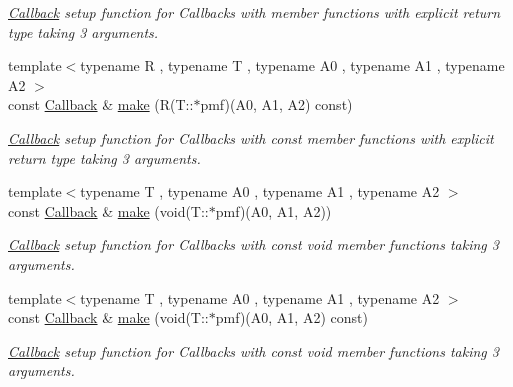 \begin{DoxyCompactItemize}
\begin{DoxyCompactList}\small\item\em \hyperlink{class_d_d4hep_1_1_callback}{Callback} setup function for Callbacks with member functions with explicit return type taking 3 arguments. \end{DoxyCompactList}\item 
{\footnotesize template$<$typename R , typename T , typename A0 , typename A1 , typename A2 $>$ }\\const \hyperlink{class_d_d4hep_1_1_callback}{Callback} \& \hyperlink{class_d_d4hep_1_1_callback_ab48c821d293aed53a590faf4566ad28f}{make} (R(T\+::$\ast$pmf)(A0, A1, A2) const)
\begin{DoxyCompactList}\small\item\em \hyperlink{class_d_d4hep_1_1_callback}{Callback} setup function for Callbacks with const member functions with explicit return type taking 3 arguments. \end{DoxyCompactList}\item 
{\footnotesize template$<$typename T , typename A0 , typename A1 , typename A2 $>$ }\\const \hyperlink{class_d_d4hep_1_1_callback}{Callback} \& \hyperlink{class_d_d4hep_1_1_callback_ac489654b2fe6f003cec7d7868d90e7dc}{make} (void(T\+::$\ast$pmf)(A0, A1, A2))
\begin{DoxyCompactList}\small\item\em \hyperlink{class_d_d4hep_1_1_callback}{Callback} setup function for Callbacks with const void member functions taking 3 arguments. \end{DoxyCompactList}\item 
{\footnotesize template$<$typename T , typename A0 , typename A1 , typename A2 $>$ }\\const \hyperlink{class_d_d4hep_1_1_callback}{Callback} \& \hyperlink{class_d_d4hep_1_1_callback_a404f91534a506ce6b7305f86d7bd8663}{make} (void(T\+::$\ast$pmf)(A0, A1, A2) const)
\begin{DoxyCompactList}\small\item\em \hyperlink{class_d_d4hep_1_1_callback}{Callback} setup function for Callbacks with const void member functions taking 3 arguments. \end{DoxyCompactList}\end{DoxyCompactItemize}
